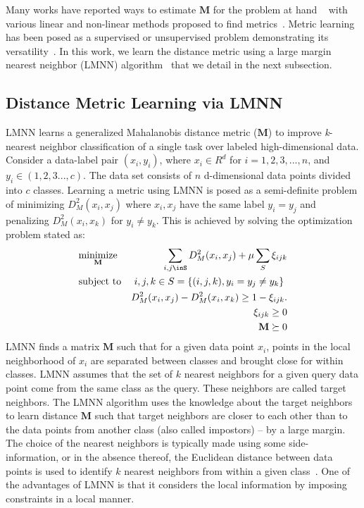 Many works have reported ways to estimate \(\mathbf{M}\) for the problem at hand ~\cite{xiang2008learning,roth2014mahalanobis} with various linear and non-linear methods proposed to find metrics~\cite{kedem2012non}. Metric learning has been posed as a supervised or unsupervised problem demonstrating its versatility~\cite{wang2015survey}.  
In this work, we learn the distance metric using a large margin nearest neighbor (LMNN) algorithm~\cite{weinberger2006distance} that we detail in the next subsection. 

\subsection{Distance Metric Learning via LMNN}
LMNN learns a generalized Mahalanobis distance metric (\(\mathbf{M}\)) to improve \textit{k}-nearest neighbor classification of a single task over labeled high-dimensional data. 
Consider a data-label pair $(x_i,y_i)$, where $x_i \in R^d$ for $i=1,2,3,...,n$, and $y_i \in (1,2,3...,c)$. 
The data set consists of $n$ d-dimensional data points divided into $c$ classes. 
Learning a metric using LMNN is posed as a semi-definite problem of minimizing $D_M^2(x_i,x_j)$ where $x_i,x_j$ have the same label $y_i=y_j$ and penalizing $D_M^2(x_i,x_k)$ for $y_i \ne y_k$. This is achieved by solving the optimization problem stated as: 
\begin{equation}
\begin{aligned}
& \underset{\mathbf{M}}{\text{minimize}} &\sum\limits_{i,j\inS}{D_M^2(x_i,x_j)} +\mu \sum\limits_{S}{ \xi_{ijk} }\\
& \text{subject to}& \text{$i,j,k \in S=\{(i,j,k),y_i=y_j\ne y_k\}$ }\\
&                  & D_M^2(x_i,x_j)-D_M^2(x_i,x_k)\geq 1-\xi_{ijk}.\\
&                  & \xi_{ijk}\geq 0\\
&                   &\mathbf{M}\succeq 0\\
\end{aligned}
\label{eq2}
\end{equation}
LMNN finds a matrix \(\mathbf{M}\) such that for a given data point $x_i$, points in the local neighborhood of $x_i$ are separated between classes and brought close for within classes. 
LMNN assumes that the set of $k$ nearest neighbors for a given query data point come from the same class as the query. These neighbors are called target neighbors. The LMNN algorithm uses the knowledge about the target neighbors to learn distance \(\mathbf{M}\) such that target neighbors are closer to each other than to the data points from another class (also called impostors) -- by a large margin.
The choice of the nearest neighbors is typically made using some side-information, or in the absence thereof, the Euclidean distance between data points is used to identify $k$ nearest neighbors from within a given class~\cite{weinberger2006distance}. One of the advantages of LMNN is that it considers the local information by imposing constraints in a local manner.

